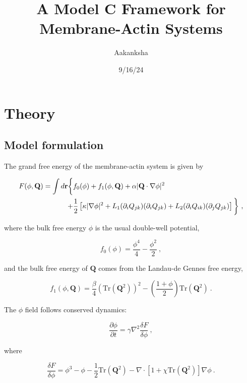 \documentclass[a4paper,11pt]{custom}
\author{Aakanksha}
\date{9/16/24}
\title{A Model C Framework for Membrane-Actin Systems}
\begin{document}
\maketitle
\tableofcontents


\section{Theory}
\label{sec:org5f843ea}

\subsection{Model formulation}
\label{sec:org977bf25}

The grand free energy of the membrane-actin system is given by

\begin{align}
	F(\phi, \mathbf{Q}) = \int d\mathbf{r} \bigg\{ 
					& f_0(\phi) + f_1(\phi, \mathbf{Q}) + \alpha|\mathbf{Q}\cdot\nabla\phi|^2 \notag \\
					+& \frac{1}{2}\left[\kappa|\nabla\phi|^2 + L_1 (\partial_i Q_{jk})(\partial_i Q_{jk}) + L_2 (\partial_i Q_{ik})(\partial_j Q_{jk})\right] 
					\bigg\} \ ,
\end{align}

where the bulk free energy \(\phi\) is the usual double-well potential,

\begin{equation}
  f_0(\phi) = \frac{\phi^4}{4} - \frac{\phi^2}{2} \ ,
\end{equation}

and the bulk free energy of \(\mathbf{Q}\) comes from the Landau-de Gennes free energy,

\begin{equation}
	f_1(\phi, \mathbf{Q}) = \frac{\beta}{4}(\mathrm{Tr}(\mathbf{Q}^2))^2 - \left(\frac{1 + \phi}{2}\right)\mathrm{Tr}(\mathbf{Q}^2) \ .
\end{equation}

The \(\phi\) field follows conserved dynamics:

\begin{equation}
  \frac{\partial \phi}{\partial t} = \gamma\nabla^2\frac{\delta F}{\delta \phi} \ ,
\end{equation}

where

\begin{equation}
  \frac{\delta F}{\delta \phi} = \phi^3 - \phi - \frac{1}{2}\mathrm{Tr}(\mathbf{Q}^2) - \nabla\cdot[1 + \chi\mathrm{Tr}(\mathbf{Q}^2)]\nabla\phi \ .
\end{equation}
\end{document}
